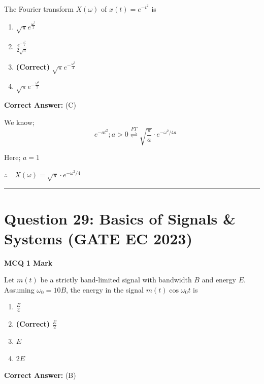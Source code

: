 \documentclass[11pt,a4paper]{article}
\begin{document}
\noindent The Fourier transform $X(\omega)$ of $x(t)=e^{-t^{2}}$ is


\begin{enumerate}[label=(\Alph*)]
    \item $\sqrt{\pi} e^{\frac{\omega^{2}}{2}}$
    \item $\frac{e^{-\frac{\omega^{2}}{4}}}{2 \sqrt{\pi}}$
    \item \textbf{(Correct)} $\sqrt{\pi} e^{-\frac{\omega^{2}}{4}}$
    \item $\sqrt{\pi} e^{-\frac{\omega^{2}}{2}}$
\end{enumerate}

\noindent \textbf{Correct Answer:} (C)

\begin{tcolorbox}[solbox, title=Detailed Solution -- Question 28]
We know; 
\[
\quad e^{-a t^{2}} ; a>0 \stackrel{F T}{\rightleftharpoons} \sqrt{\frac{\pi}{a}} \cdot e^{-\omega^{2} / 4 a}
\]

Here; $a=1$

$\therefore \quad X(\omega)=\sqrt{\pi} \cdot e^{-\omega^{2} / 4}$
\end{tcolorbox}

\vspace{1.5em}
\hrule
\vspace{1.5em}

\section*{Question 29: Basics of Signals \& Systems (GATE EC 2023)}
\noindent \textbf{\color{primary}MCQ} \hfill \textbf{\color{secondary}1 Mark}


\noindent Let $m(t)$ be a strictly band-limited signal with bandwidth $B$ and energy $E$. Assuming $\omega_{0}=10 B$, the energy in the signal $m(t) \cos \omega_{0} t$ is


\begin{enumerate}[label=(\Alph*)]
    \item $\frac{E}{4}$
    \item \textbf{(Correct)} $\frac{E}{2}$
    \item $E$
    \item $2 E$
\end{enumerate}

\noindent \textbf{Correct Answer:} (B)
\end{document}
